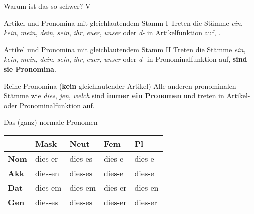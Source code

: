 \begin{frame}
  {Warum ist das so schwer? V}
  \pause
  \begin{block}{Artikel und Pronomina mit gleichlautendem Stamm I}
    Treten die Stämme \textit{ein}, \textit{kein}, \textit{mein}, \textit{dein}, \textit{sein}, \textit{ihr}, \textit{euer}, \textit{unser} oder \textit{d-} in Artikelfunktion auf, .
  \end{block}
  \pause
  \begin{block}{Artikel und Pronomina mit gleichlautendem Stamm II}
    Treten die Stämme \textit{ein}, \textit{kein}, \textit{mein}, \textit{dein}, \textit{sein}, \textit{ihr}, \textit{euer}, \textit{unser} oder \textit{d-} in Pronominalfunktion auf, \alert{\textbf{sind sie Pronomina}}.
  \end{block}
  \Zeile
  \pause
  \begin{block}{Reine Pronomina (\textbf{kein} gleichlautender Artikel)}
    Alle anderen pronominalen Stämme wie \textit{dies}, \textit{jen}, \textit{welch} sind \alert{\textbf{immer ein Pronomen}} und treten in Artikel- oder Pronominalfunktion auf.
  \end{block}
\end{frame}


\begin{frame}
  {Das (ganz) normale Pronomen}
  \pause
  \begin{center}
    \begin{tabular}{lllll}
      \toprule
      \multicolumn{1}{c}{} & \textbf{Mask} & \textbf{Neut} & \textbf{Fem} & \textbf{Pl} \\
      \midrule
      \textbf{Nom} & dies-er & dies-es & dies-e & dies-e \\
      \textbf{Akk} & dies-en & dies-es & dies-e & dies-e \\
      \textbf{Dat} & dies-em & dies-em & dies-er & dies-en \\
      \textbf{Gen} & dies-es & dies-es & dies-er & dies-er \\
      \bottomrule
    \end{tabular}
  \end{center}
\end{frame}


